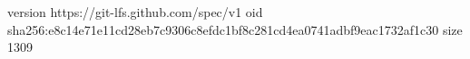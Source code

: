 version https://git-lfs.github.com/spec/v1
oid sha256:e8c14e71e11cd28eb7c9306c8efdc1bf8c281cd4ea0741adbf9eac1732af1c30
size 1309
